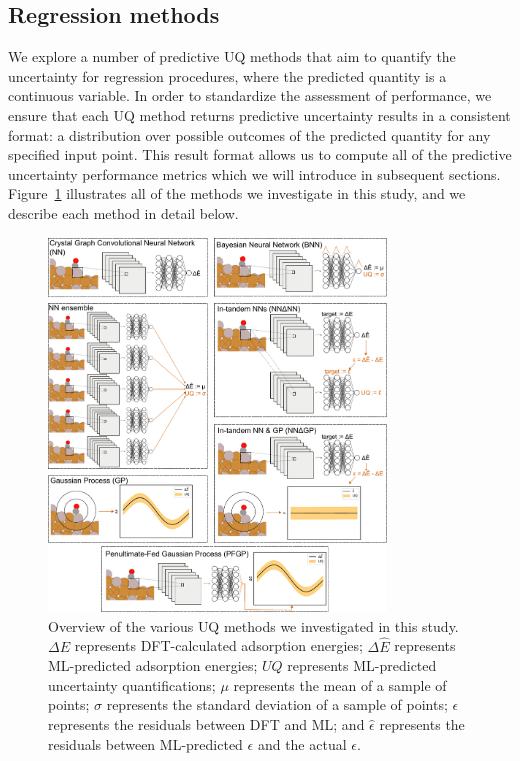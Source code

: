 \documentclass[]{achemso}
\begin{document}
\subsection{Regression methods}

We explore a number of predictive \gls{UQ} methods that aim to quantify the
uncertainty for regression procedures, where the predicted quantity is a
continuous variable. In order to standardize the assessment of performance, we
ensure that each \gls{UQ} method returns predictive uncertainty results in a
consistent format: a distribution over possible outcomes of the predicted
quantity for any specified input point. This result format allows us to compute
all of the predictive uncertainty performance metrics which we will introduce
in subsequent sections. Figure~\ref{fig:methods} illustrates all of the methods
we investigate in this study, and we describe each method in detail below.

\begin{figure}
    \centering
    \includegraphics[width=0.8\textwidth]{methods.pdf}
    \caption{Overview of the various \gls{UQ} methods we investigated in this study.
    $\Delta E$ represents \gls{DFT}-calculated adsorption energies;
    $\Delta \hat{E}$ represents \gls{ML}-predicted adsorption energies;
    $UQ$ represents \gls{ML}-predicted uncertainty quantifications;
    $\mu$ represents the mean of a sample of points;
    $\sigma$ represents the standard deviation of a sample of points;
    $\epsilon$ represents the residuals between \gls{DFT} and \gls{ML};
    and $\hat{\epsilon}$ represents the residuals between \gls{ML}-predicted $\epsilon$ and the actual $\epsilon$.
    }\label{fig:methods}
\end{figure}
\end{document}
